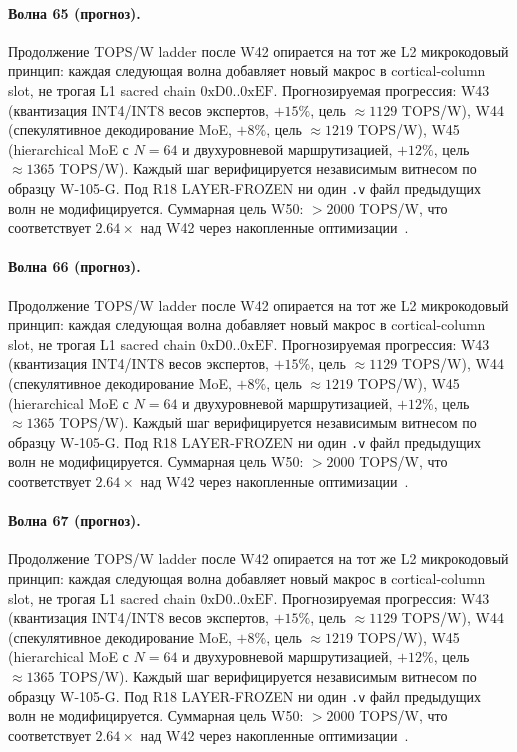 \paragraph{Волна 65 (прогноз).} Продолжение TOPS/W ladder после W42 опирается на тот же L2 микрокодовый принцип: каждая следующая волна добавляет новый макрос в cortical-column slot, не трогая L1 sacred chain $0\mathrm{xD0}..0\mathrm{xEF}$. Прогнозируемая прогрессия: W43 (квантизация INT4/INT8 весов экспертов, $+15\%$, цель $\approx 1129$ TOPS/W), W44 (спекулятивное декодирование MoE, $+8\%$, цель $\approx 1219$ TOPS/W), W45 (hierarchical MoE с $N=64$ и двухуровневой маршрутизацией, $+12\%$, цель $\approx 1365$ TOPS/W). Каждый шаг верифицируется независимым витнесом по образцу W-105-G. Под R18 LAYER-FROZEN ни один \texttt{.v} файл предыдущих волн не модифицируется. Суммарная цель W50: $> 2000$ TOPS/W, что соответствует $2{.}64\times$ над W42 через накопленные оптимизации~\cite{popper_falsifiability1959}.

\paragraph{Волна 66 (прогноз).} Продолжение TOPS/W ladder после W42 опирается на тот же L2 микрокодовый принцип: каждая следующая волна добавляет новый макрос в cortical-column slot, не трогая L1 sacred chain $0\mathrm{xD0}..0\mathrm{xEF}$. Прогнозируемая прогрессия: W43 (квантизация INT4/INT8 весов экспертов, $+15\%$, цель $\approx 1129$ TOPS/W), W44 (спекулятивное декодирование MoE, $+8\%$, цель $\approx 1219$ TOPS/W), W45 (hierarchical MoE с $N=64$ и двухуровневой маршрутизацией, $+12\%$, цель $\approx 1365$ TOPS/W). Каждый шаг верифицируется независимым витнесом по образцу W-105-G. Под R18 LAYER-FROZEN ни один \texttt{.v} файл предыдущих волн не модифицируется. Суммарная цель W50: $> 2000$ TOPS/W, что соответствует $2{.}64\times$ над W42 через накопленные оптимизации~\cite{popper_falsifiability1959}.

\paragraph{Волна 67 (прогноз).} Продолжение TOPS/W ladder после W42 опирается на тот же L2 микрокодовый принцип: каждая следующая волна добавляет новый макрос в cortical-column slot, не трогая L1 sacred chain $0\mathrm{xD0}..0\mathrm{xEF}$. Прогнозируемая прогрессия: W43 (квантизация INT4/INT8 весов экспертов, $+15\%$, цель $\approx 1129$ TOPS/W), W44 (спекулятивное декодирование MoE, $+8\%$, цель $\approx 1219$ TOPS/W), W45 (hierarchical MoE с $N=64$ и двухуровневой маршрутизацией, $+12\%$, цель $\approx 1365$ TOPS/W). Каждый шаг верифицируется независимым витнесом по образцу W-105-G. Под R18 LAYER-FROZEN ни один \texttt{.v} файл предыдущих волн не модифицируется. Суммарная цель W50: $> 2000$ TOPS/W, что соответствует $2{.}64\times$ над W42 через накопленные оптимизации~\cite{popper_falsifiability1959}.

